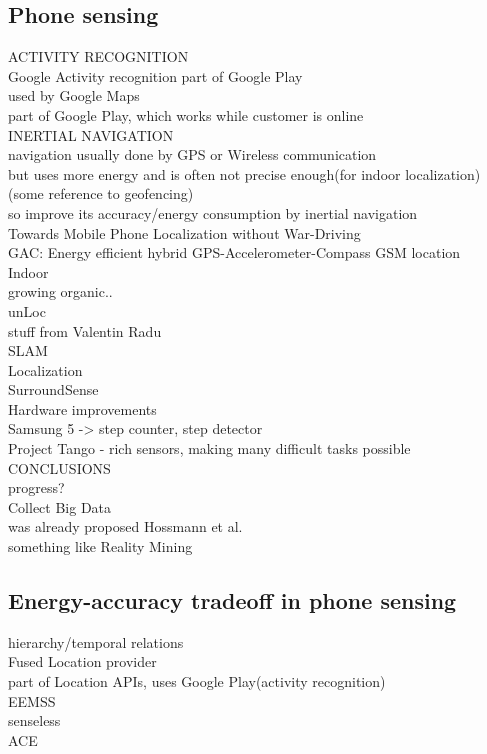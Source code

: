 \subsection{Phone sensing}
ACTIVITY RECOGNITION\\
	Google Activity recognition part of Google Play \cite{android:activityrecognition}\\
		used by Google Maps\\
		part of Google Play, which works while customer is online\\

INERTIAL NAVIGATION\\
	navigation usually done by GPS or Wireless communication\\
	but uses more energy and is often not precise enough(for indoor localization)\\
		(some reference to geofencing)\\
	so improve its accuracy/energy consumption by inertial navigation\\
	Towards Mobile Phone Localization without War-Driving\cite{constandache:localization}\\
	GAC: Energy efficient hybrid GPS-Accelerometer-Compass GSM location\\
	Indoor\\
		growing organic..\\
		unLoc\\
		stuff from Valentin Radu\\
	
SLAM\\

Localization \\
	SurroundSense \cite{azizyan:surroundsense}\\

Hardware improvements\\
	Samsung 5 -> step counter, step detector\\
	Project Tango - rich sensors, making many difficult tasks possible\\

CONCLUSIONS\\
	progress?\\
	Collect Big Data\\
		was already proposed Hossmann et al.\cite{hossmann:bigdatasets}\\
		something like Reality Mining \cite{eagle:realitymining}\\
	
\subsection{Energy-accuracy tradeoff in phone sensing}
hierarchy/temporal relations\\
	Fused Location provider\cite{android:locationapi}\\
		part of Location APIs, uses Google Play(activity recognition)\\
	EEMSS \cite{wang:eemss}\\
	senseless \cite{benabdesslem:senseless}\\
	ACE \cite{nath:ace}\\

